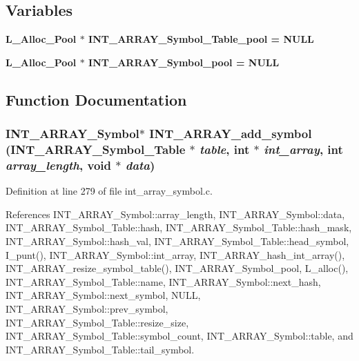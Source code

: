 \subsection*{Variables}
\begin{CompactItemize}
\item 
\bf{L\_\-Alloc\_\-Pool} $\ast$ \bf{INT\_\-ARRAY\_\-Symbol\_\-Table\_\-pool} = NULL
\item 
\bf{L\_\-Alloc\_\-Pool} $\ast$ \bf{INT\_\-ARRAY\_\-Symbol\_\-pool} = NULL
\end{CompactItemize}


\subsection{Function Documentation}
\subsubsection{\setlength{\rightskip}{0pt plus 5cm}\bf{INT\_\-ARRAY\_\-Symbol}$\ast$ INT\_\-ARRAY\_\-add\_\-symbol (\bf{INT\_\-ARRAY\_\-Symbol\_\-Table} $\ast$ {\em table}, int $\ast$ {\em int\_\-array}, int {\em array\_\-length}, void $\ast$ {\em data})}\label{int__array__symbol_8c_0792cc6c36dfc0546874a3490e2aed35}




Definition at line 279 of file int\_\-array\_\-symbol.c.

References INT\_\-ARRAY\_\-Symbol::array\_\-length, INT\_\-ARRAY\_\-Symbol::data, INT\_\-ARRAY\_\-Symbol\_\-Table::hash, INT\_\-ARRAY\_\-Symbol\_\-Table::hash\_\-mask, INT\_\-ARRAY\_\-Symbol::hash\_\-val, INT\_\-ARRAY\_\-Symbol\_\-Table::head\_\-symbol, I\_\-punt(), INT\_\-ARRAY\_\-Symbol::int\_\-array, INT\_\-ARRAY\_\-hash\_\-int\_\-array(), INT\_\-ARRAY\_\-resize\_\-symbol\_\-table(), INT\_\-ARRAY\_\-Symbol\_\-pool, L\_\-alloc(), INT\_\-ARRAY\_\-Symbol\_\-Table::name, INT\_\-ARRAY\_\-Symbol::next\_\-hash, INT\_\-ARRAY\_\-Symbol::next\_\-symbol, NULL, INT\_\-ARRAY\_\-Symbol::prev\_\-symbol, INT\_\-ARRAY\_\-Symbol\_\-Table::resize\_\-size, INT\_\-ARRAY\_\-Symbol\_\-Table::symbol\_\-count, INT\_\-ARRAY\_\-Symbol::table, and INT\_\-ARRAY\_\-Symbol\_\-Table::tail\_\-symbol.
